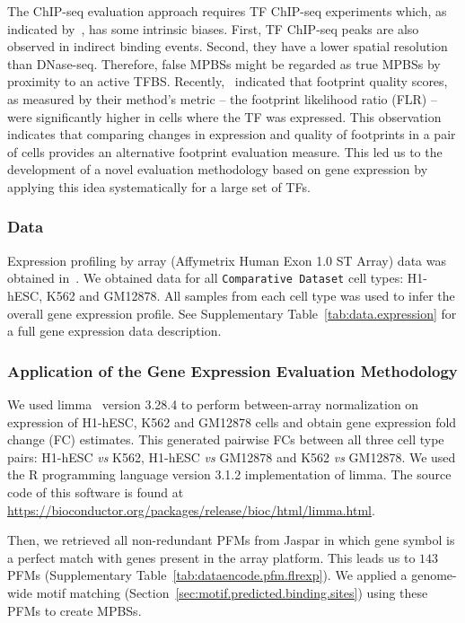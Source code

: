 The ChIP-seq evaluation approach requires TF ChIP-seq experiments which, as indicated by~\cite{yardimci2014}, has some intrinsic biases. First, TF ChIP-seq peaks are also observed in indirect binding events. Second, they have a lower spatial resolution than DNase-seq. Therefore, false MPBSs might be regarded as true MPBSs by proximity to an active TFBS. Recently,~\cite{yardimci2014} indicated that footprint quality scores, as measured by their method's metric -- the footprint likelihood ratio (FLR) -- were significantly higher in cells where the TF was expressed. This observation indicates that comparing changes in expression and quality of footprints in a pair of cells provides an alternative footprint evaluation measure. This led us to the development of a novel evaluation methodology based on gene expression by applying this idea systematically for a large set of TFs.

\subsubsection{Data}

Expression profiling by array (Affymetrix Human Exon 1.0 ST Array) data was obtained in~\cite{encode2012}. We obtained data for all {\tt Comparative Dataset} cell types: H1-hESC, K562 and GM12878. All samples from each cell type was used to infer the overall gene expression profile. See Supplementary Table~\ref{tab:data.expression} for a full gene expression data description.

\subsubsection{Application of the Gene Expression Evaluation Methodology}

We used limma~\citep{ritchie2015} version 3.28.4 to perform between-array normalization on expression of H1-hESC, K562 and GM12878 cells and obtain gene expression fold change (FC) estimates. This generated pairwise FCs between all three cell type pairs: H1-hESC \emph{vs} K562, H1-hESC \emph{vs} GM12878 and K562 \emph{vs} GM12878. We used the R programming language version 3.1.2 implementation of limma. The source code of this software is found at \url{https://bioconductor.org/packages/release/bioc/html/limma.html}.

Then, we retrieved all non-redundant PFMs from Jaspar in which gene symbol is a perfect match with genes present in the array platform. This leads us to $143$ PFMs (Supplementary Table~\ref{tab:dataencode.pfm.flrexp}). We applied a genome-wide motif matching (Section~\ref{sec:motif.predicted.binding.sites}) using these PFMs to create MPBSs.

